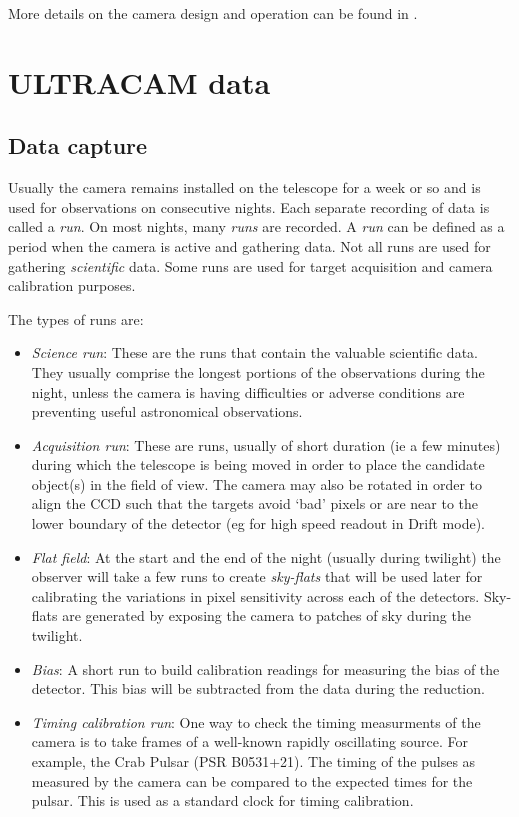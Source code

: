 More details on the camera design and operation can be found in \cite{dhillon07}.

\section{ULTRACAM data}

\subsection{Data capture}
Usually the camera remains installed on the telescope for a week or so and is used for observations on consecutive nights. Each separate recording of data is called a \emph{run}. On most nights, many \emph{runs} are recorded. A \emph{run} can be defined as a period when the camera is active and gathering data. Not all runs are used for gathering \emph{scientific} data. Some runs are used for target acquisition and camera calibration purposes. 

The types of runs are: 
\begin{itemize}
	\item \emph{Science run}: These are the runs that contain the valuable scientific data. They usually comprise the longest portions of the observations during the night, unless the camera is having difficulties or adverse conditions are preventing useful astronomical observations.
	\item \emph{Acquisition run}: These are runs, usually of short duration (ie a few minutes) during which the telescope is being moved in order to place the candidate object(s) in the field of view. The camera may also be rotated in order to align the CCD such that the targets avoid `bad' pixels or are near to the lower boundary of the detector (eg for high speed readout in Drift mode). 
	\item \emph{Flat field}: At the start and the end of the night (usually during twilight) the observer will take a few runs to create \emph{sky-flats} that will be used later for calibrating the variations in pixel sensitivity across each of the detectors.  Sky-flats are generated by exposing the camera to patches of sky during the twilight. 
	\item \emph{Bias}: A short run to build calibration readings for measuring the bias of the detector. This bias will be subtracted from the data during the reduction. 
	\item \emph{Timing calibration run}: One way to check the timing measurments of the camera is to take frames of a well-known rapidly oscillating source. For example, the Crab Pulsar (PSR B0531+21). The timing of the pulses as measured by the camera can be compared to the expected times for the pulsar. This is used as a standard clock for timing calibration.
\end{itemize}

